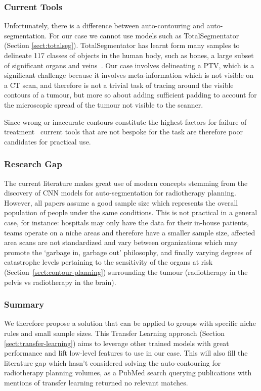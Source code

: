 \documentclass[11pt,twoside]{report}
\begin{document}
\subsubsection{Current Tools}

Unfortunately, there is a difference between auto-contouring and auto-segmentation. For our case we cannot use models such as TotalSegmentator (Section \ref{sect:totalseg}). TotalSegmentator has learnt form many samples to delineate 117 classes of objects in the human body, such as bones, a large subset of significant organs and veins~\cite{totalsegmentor-git}. Our case involves delineating a PTV, which is a significant challenge because it involves meta-information which is not visible on a CT scan, and therefore is not a trivial task of tracing around the visible contours of a tumour, but more so about adding sufficient padding to account for the microscopic spread of the tumour not visible to the scanner.

Since wrong or inaccurate contours constitute the highest factors for failure of treatment~\cite{Rhee2020-ms} current tools that are not bespoke for the task are therefore poor candidates for practical use.

\subsubsection{Research Gap}

The current literature makes great use of modern concepts stemming from the discovery of CNN models for auto-segmentation for radiotherapy planning. However, all papers assume a good sample size which represents the overall population of people under the same conditions. This is not practical in a general case, for instance: hospitals may only have the data for their in-house patients, teams operate on a niche areas and therefore have a smaller sample size, affected area scans are not standardized and vary between organizations which may promote the `garbage in, garbage out' philosophy, and finally varying degrees of catastrophe levels pertaining to the sensitivity of the organs at risk (Section~\ref{sect:contour-planning}) surrounding the tumour (radiotherapy in the pelvis vs radiotherapy in the brain).

\subsubsection{Summary}

We therefore propose a solution that can be applied to groups with specific niche rules and small sample sizes. This Transfer Learning approach (Section \ref{sect:transfer-learning}) aims to leverage other trained models with great performance and lift low-level features to use in our case. This will also fill the literature gap which hasn't considered solving the auto-contouring for radiotherapy planning volumes, as a PubMed search querying publications with mentions of transfer learning returned no relevant matches.
\end{document}
